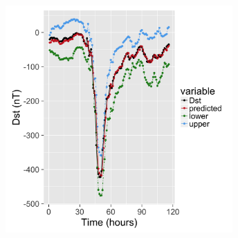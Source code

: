\documentclass[a4paper]{article}            %
\begin{document}
\begin{slidetop}
    
\end{slidetop}


\begin{slidetop}
    \begin{center}
        \includegraphics[width=0.65\textwidth]{PredErrBars_Storm46.png}%
    \end{center}
    
    
\end{slidetop}
\end{document}
